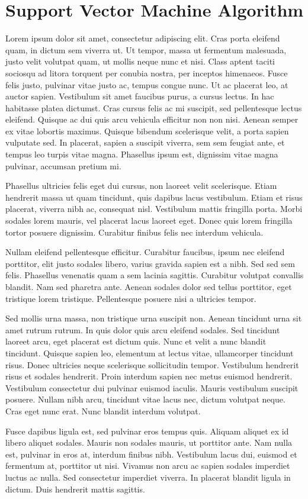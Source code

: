 \section{Support Vector Machine Algorithm}

Lorem ipsum dolor sit amet, consectetur adipiscing elit. Cras porta eleifend quam, in dictum sem viverra ut. Ut tempor, massa ut fermentum malesuada, justo velit volutpat quam, ut mollis neque nunc et nisi. Class aptent taciti sociosqu ad litora torquent per conubia nostra, per inceptos himenaeos. Fusce felis justo, pulvinar vitae justo ac, tempus congue nunc. Ut ac placerat leo, at auctor sapien. Vestibulum sit amet faucibus purus, a cursus lectus. In hac habitasse platea dictumst. Cras cursus felis ac mi suscipit, sed pellentesque lectus eleifend. Quisque ac dui quis arcu vehicula efficitur non non nisi. Aenean semper ex vitae lobortis maximus. Quisque bibendum scelerisque velit, a porta sapien vulputate sed. In placerat, sapien a suscipit viverra, sem sem feugiat ante, et tempus leo turpis vitae magna. Phasellus ipsum est, dignissim vitae magna pulvinar, accumsan pretium mi.


Phasellus ultricies felis eget dui cursus, non laoreet velit scelerisque. Etiam hendrerit massa ut quam tincidunt, quis dapibus lacus vestibulum. Etiam et risus placerat, viverra nibh ac, consequat nisl. Vestibulum mattis fringilla porta. Morbi sodales lorem mauris, vel placerat lacus laoreet eget. Donec quis lorem fringilla tortor posuere dignissim. Curabitur finibus felis nec interdum vehicula.


Nullam eleifend pellentesque efficitur. Curabitur faucibus, ipsum nec eleifend porttitor, elit justo sodales libero, varius gravida sapien est a nibh. Sed sed sem felis. Phasellus venenatis quam a sem lacinia sagittis. Curabitur volutpat convallis blandit. Nam sed pharetra ante. Aenean sodales dolor sed tellus porttitor, eget tristique lorem tristique. Pellentesque posuere nisi a ultricies tempor.


Sed mollis urna massa, non tristique urna suscipit non. Aenean tincidunt urna sit amet rutrum rutrum. In quis dolor quis arcu eleifend sodales. Sed tincidunt laoreet arcu, eget placerat est dictum quis. Nunc et velit a nunc blandit tincidunt. Quisque sapien leo, elementum at lectus vitae, ullamcorper tincidunt risus. Donec ultricies neque scelerisque sollicitudin tempor. Vestibulum hendrerit risus et sodales hendrerit. Proin interdum sapien nec metus euismod hendrerit. Vestibulum consectetur dui pulvinar euismod iaculis. Mauris vestibulum suscipit posuere. Nullam nibh arcu, tincidunt vitae lacus nec, dictum volutpat neque. Cras eget nunc erat. Nunc blandit interdum volutpat.


Fusce dapibus ligula est, sed pulvinar eros tempus quis. Aliquam aliquet ex id libero aliquet sodales. Mauris non sodales mauris, ut porttitor ante. Nam nulla est, pulvinar in eros at, interdum finibus nibh. Vestibulum lacus dui, euismod et fermentum at, porttitor ut nisi. Vivamus non arcu ac sapien sodales imperdiet luctus ac nulla. Sed consectetur imperdiet viverra. In placerat blandit ligula in dictum. Duis hendrerit mattis sagittis.



